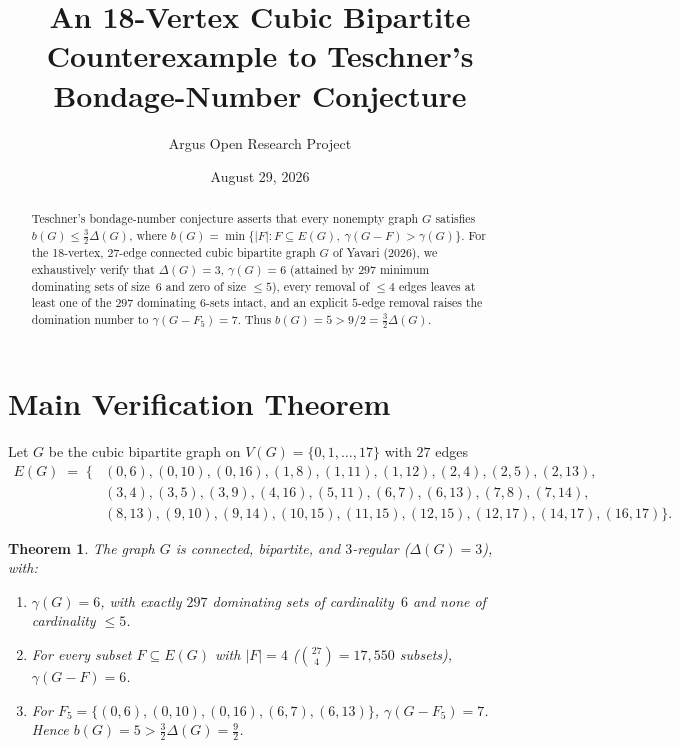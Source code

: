 \documentclass[10pt,reqno]{amsart}
\title[An 18-Vertex Cubic Bipartite Counterexample to Teschner's Conjecture]
{An 18-Vertex Cubic Bipartite Counterexample to Teschner's Bondage-Number Conjecture}
\author{Argus Open Research Project}
\date{August 29, 2026}
\newtheorem{theorem}{Theorem}[section]
\theoremstyle{definition}
\begin{document}
\begin{abstract}
Teschner's bondage-number conjecture asserts that every nonempty graph $G$ satisfies $b(G)\le \frac{3}{2}\Delta(G)$, where $b(G)=\min\{|F| : F\subseteq E(G),\ \gamma(G-F)>\gamma(G)\}$. For the 18-vertex, 27-edge connected cubic bipartite graph $G$ of Yavari (2026), we exhaustively verify that $\Delta(G)=3$, $\gamma(G)=6$ (attained by $297$ minimum dominating sets of size~$6$ and zero of size $\le 5$), every removal of $\le 4$ edges leaves at least one of the $297$ dominating $6$-sets intact, and an explicit $5$-edge removal raises the domination number to $\gamma(G-F_5)=7$. Thus $b(G)=5 > 9/2 = \frac{3}{2}\Delta(G)$.
\end{abstract}
\maketitle
\section{Main Verification Theorem}
Let $G$ be the cubic bipartite graph on $V(G)=\{0,1,\dots,17\}$ with $27$ edges
\begin{align*}
  E(G) \;=\; \bigl\{&(0,6),(0,10),(0,16),(1,8),(1,11),(1,12),(2,4),(2,5),(2,13),\\
  &(3,4),(3,5),(3,9),(4,16),(5,11),(6,7),(6,13),(7,8),(7,14),\\
  &(8,13),(9,10),(9,14),(10,15),(11,15),(12,15),(12,17),(14,17),(16,17)\bigr\}.
\end{align*}
\begin{theorem}
The graph $G$ is connected, bipartite, and $3$-regular ($\Delta(G)=3$), with:
\begin{enumerate}[label=\textup{(\arabic*)}]
  \item $\gamma(G)=6$, with exactly $297$ dominating sets of cardinality~$6$ and none of cardinality $\le 5$.
  \item For every subset $F\subseteq E(G)$ with $|F|=4$ ($\binom{27}{4}=17{,}550$ subsets), $\gamma(G-F)=6$.
  \item For $F_5=\{(0,6),(0,10),(0,16),(6,7),(6,13)\}$, $\gamma(G-F_5)=7$. Hence $b(G)=5 > \frac{3}{2}\Delta(G)=\frac{9}{2}$.
\end{enumerate}
\end{theorem}
\end{document}
